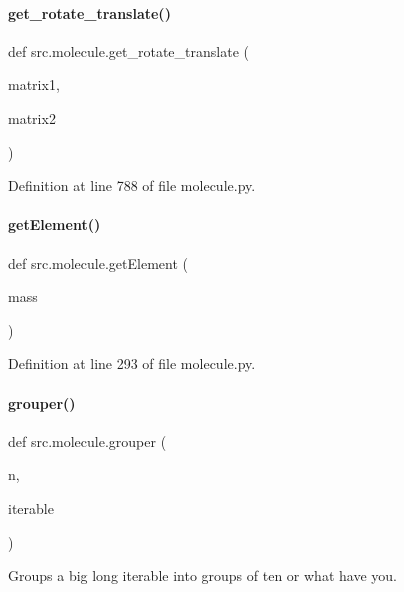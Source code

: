 \paragraph{\texorpdfstring{get\+\_\+rotate\+\_\+translate()}{get\_rotate\_translate()}}
{\footnotesize\ttfamily def src.\+molecule.\+get\+\_\+rotate\+\_\+translate (\begin{DoxyParamCaption}\item[{}]{matrix1,  }\item[{}]{matrix2 }\end{DoxyParamCaption})}



Definition at line 788 of file molecule.\+py.

\mbox{\label{namespacesrc_1_1molecule_ae26e509ce54bf76724a18ba91107df72}} 
\paragraph{\texorpdfstring{get\+Element()}{getElement()}}
{\footnotesize\ttfamily def src.\+molecule.\+get\+Element (\begin{DoxyParamCaption}\item[{}]{mass }\end{DoxyParamCaption})}



Definition at line 293 of file molecule.\+py.

\mbox{\label{namespacesrc_1_1molecule_a3d07eb6fe9de1d679c82213a4d7e988d}} 
\paragraph{\texorpdfstring{grouper()}{grouper()}}
{\footnotesize\ttfamily def src.\+molecule.\+grouper (\begin{DoxyParamCaption}\item[{}]{n,  }\item[{}]{iterable }\end{DoxyParamCaption})}



Groups a big long iterable into groups of ten or what have you. 



